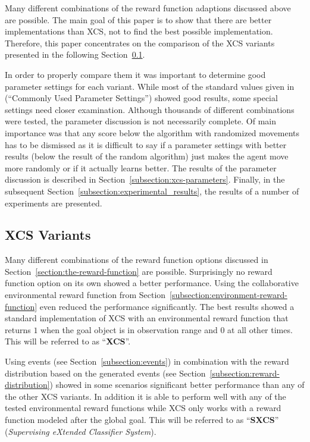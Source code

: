 Many different combinations of the reward function adaptions discussed above are possible. The main goal of this paper is to show that there are better implementations than XCS, not to find the best possible implementation. Therefore, this paper concentrates on the comparison of the XCS variants presented in the following Section~\ref{subsection:xcs-variants}.

In order to properly compare them it was important to determine good parameter settings for each variant. While most of the standard values given in~\cite{BW02} (``Commonly Used Parameter Settings'') showed good results, some special settings need closer examination. Although thousands of different combinations were tested, the parameter discussion is not necessarily complete. Of main importance was that any score below the algorithm with randomized movements has to be dismissed as it is difficult to say if a parameter settings with better results (below the result of the random algorithm) just makes the agent move more randomly or if it actually learns better. The results of the parameter discussion is described in Section~\ref{subsection:xcs-parameters}. Finally, in the subsequent Section~\ref{subsection:experimental_results}, the results of a number of experiments are presented.

\subsection{XCS Variants}
\label{subsection:xcs-variants}

Many different combinations of the reward function options discussed in Section~\ref{section:the-reward-function} are possible. Surprisingly no reward function option on its own showed a better performance. Using the collaborative environmental reward function from Section~\ref{subsection:environment-reward-function} even reduced the performance significantly. The best results showed a standard implementation of XCS with an environmental reward function that returns $1$ when the goal object is in observation range and $0$ at all other times. This will be referred to as ``{\bf XCS}''.

Using events (see Section~\ref{subsection:events}) in combination with the reward distribution based on the generated events (see Section~\ref{subsection:reward-distribution}) showed in some scenarios significant better performance than any of the other XCS variants. In addition it is able to perform well with any of the tested environmental reward functions while XCS only works with a reward function modeled after the global goal. This will be referred to as ``{\bf SXCS}'' (\emph{Supervising eXtended Classifier System}).


